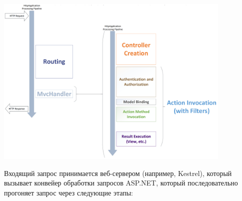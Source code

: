 \documentclass{../../text-style}
\begin{document}
\begin{center}
    \includegraphics[width=0.85\textwidth]{requestLifecycle.png}
\end{center}

Входящий запрос принимается веб-сервером (например, Kestrel), который вызывает конвейер обработки запросов ASP.NET, который последовательно прогоняет запрос через следующие этапы:
\end{document}
